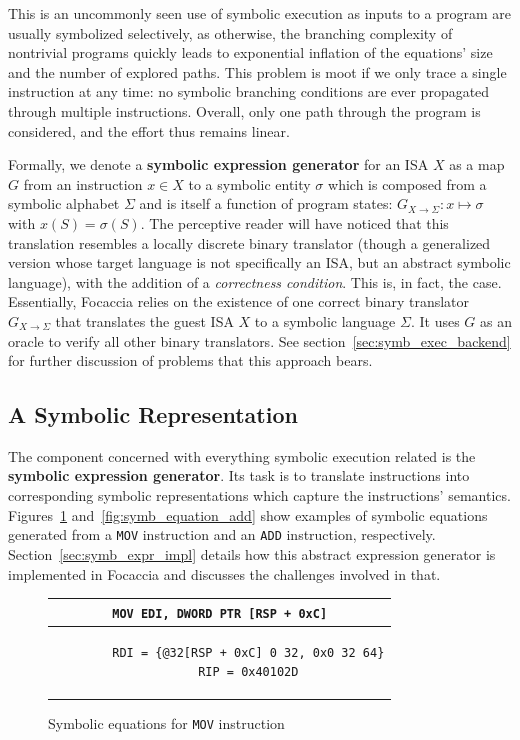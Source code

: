 This is an uncommonly seen use of symbolic execution as inputs to a program are usually symbolized selectively, as
otherwise, the branching complexity of nontrivial programs quickly leads to exponential inflation of the equations' size
and the number of explored paths. This problem is moot if we only trace a single instruction at any time: no symbolic
branching conditions are ever propagated through multiple instructions.  Overall, only one path through the program is
considered, and the effort thus remains linear.

Formally, we denote a \textbf{symbolic expression generator} for an \ac{ISA} $X$ as a map $G$ from an instruction $x \in
X$ to a symbolic entity $\sigma$ which is composed from a symbolic alphabet $\Sigma$ and is itself a function of program
states: $G_{X \rightarrow \Sigma}: x \mapsto \sigma$ with $x(S) = \sigma(S)$. The perceptive reader will have noticed
that this translation resembles a locally discrete binary translator (though a generalized version whose target language
is not specifically an \ac{ISA}, but an abstract symbolic language), with the addition of a \textit{correctness
condition}. This is, in fact, the case. Essentially, Focaccia relies on the existence of one correct binary translator
$G_{X \rightarrow \Sigma}$ that translates the guest \ac{ISA} $X$ to a symbolic language $\Sigma$. It uses $G$ as an
oracle to verify all other binary translators. See section~\ref{sec:symb_exec_backend} for further discussion of
problems that this approach bears.

\subsection{A Symbolic Representation}

The component concerned with everything symbolic execution related is the \textbf{symbolic expression generator}. Its
task is to translate instructions into corresponding symbolic representations which capture the instructions' semantics.
Figures~\ref{fig:symb_equation_mov} and~\ref{fig:symb_equation_add} show examples of symbolic equations generated from a
\texttt{MOV} instruction and an \texttt{ADD} instruction, respectively. Section~\ref{sec:symb_expr_impl} details how
this abstract expression generator is implemented in Focaccia and discusses the challenges involved in that.

\begin{figure}[htbp]
    \centering
    \begin{tabular}{c}
    \texttt{MOV        EDI, DWORD PTR [RSP + 0xC]} \\
    \midrule
    \begin{lstlisting}
        RDI = {@32[RSP + 0xC] 0 32, 0x0 32 64}
        RIP = 0x40102D
    \end{lstlisting}
    \end{tabular}
    \caption{Symbolic equations for \texttt{MOV} instruction}\label{fig:symb_equation_mov}
\end{figure}

